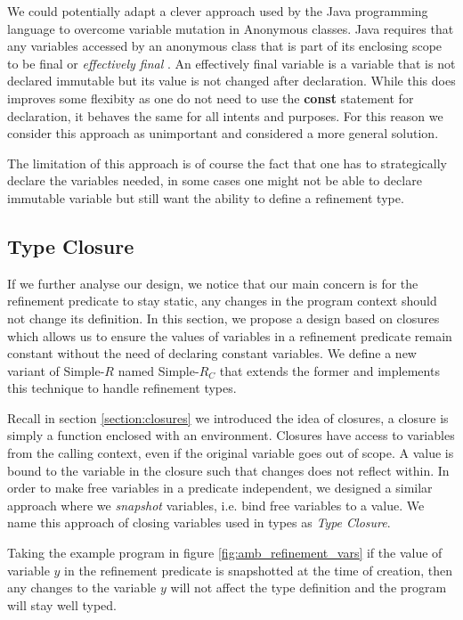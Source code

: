 \documentclass[a4paper,12pt]{report}
\begin{document}
\par
We could potentially adapt a clever approach used by the Java programming 
language to overcome variable mutation in Anonymous classes. Java requires that 
any variables accessed by an anonymous class that is part of 
its enclosing scope to be final or \textit{effectively final} 
\cite{effectFinal}. An effectively final variable is a variable that is not 
declared immutable but its value is not changed after declaration. While this 
does improves some flexibity as one do not need to use the \textbf{const} 
statement for declaration, it behaves the same for all intents and purposes. 
For this reason we consider this approach as unimportant and considered a more 
general solution. 

\par
The limitation of this approach is of course the fact that one has to strategically 
declare the variables needed, in some cases one might not be able to declare 
immutable variable but still want the ability to define a refinement type.

\subsection{Type Closure}
If we further analyse our design, we notice that our main concern is for the 
refinement predicate to stay static, any changes in the program context should 
not change its definition. In this section, we propose a design based on closures 
which allows us to ensure the values of variables in a refinement predicate remain 
constant without the need of declaring constant variables. We define a new variant of 
Simple-$R$ named Simple-$R_{C}$ that extends the former and implements this 
technique to handle refinement types. 

\par
Recall in section \ref{section:closures} we introduced the idea of closures, a 
closure is simply a function enclosed with an environment. Closures have access to 
variables from the calling context, even if the original variable goes out of 
scope. A value is bound to the variable in the closure such that changes does 
not reflect within. In order to make free variables in a predicate independent, 
we designed a similar approach where we \emph{snapshot} variables, i.e. 
bind free variables to a value. We name this approach of closing 
variables used in types as \emph{Type Closure}. 

\par
Taking the example program in figure \ref{fig:amb_refinement_vars} if the 
value of variable $y$ in the refinement predicate is snapshotted at the time of 
creation, then any changes to the variable $y$ will not 
affect the type definition and the program will stay well typed.
\end{document}
